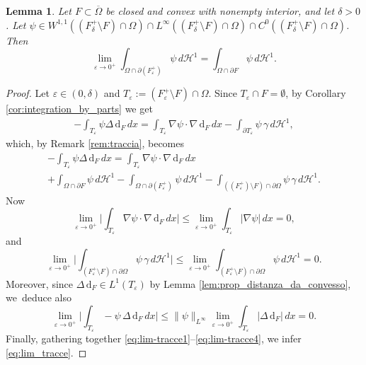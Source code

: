 \documentclass[11pt]{article}
\numberwithin{equation}{section}
\let\eps\varepsilon
\let\Om\Omega
\newcommand{\di}{\,\mathrm{d}}
\newtheorem{lemma}[theorem]{Lemma}
\theoremstyle{definition}
\begin{document}
\begin{lemma}\label{lem:limite_di_traccia}
Let $F\subset\overline\Om$ be closed and convex with nonempty interior,
and let $\delta>0$.
Let $\psi\in W^{1,1}((F^+_{\delta}\setminus F)\cap\Om)\cap L^\infty((F^+_{\delta}\setminus F)\cap\Om)\cap C^0((F^+_{\delta}\setminus F)\cap\Om)$. Then
\begin{equation}\label{eq:lim_tracce}
\lim_{\eps\to0^+} \int_{\Om\cap\partial(F^+_\eps)}\psi\,d\mathcal{H}^1=\int_{\Om\cap\partial F}\psi\,d\mathcal{H}^1.
\end{equation}
\end{lemma}

\begin{proof}
Let $\eps\in(0,\delta)$ and $T_\eps:=(F^+_\eps\setminus F)\cap \Omega$. Since $T_\eps\cap F=\emptyset$, by Corollary \ref{cor:integration_by_parts} we get
\begin{equation}\label{eq:lim_tracce*}
\begin{split}
-\int_{T_\eps}\psi\Delta\di_{F}\,dx
=
\int_{T_\eps} \nabla\psi\cdot\nabla\di_{F}\,dx- \int_{\partial T_\eps}\psi\,\gamma\,d\mathcal{H}^1,
\end{split}
\end{equation}
which, by Remark \ref{rem:traccia}, becomes
\begin{multline}\label{eq:lim-tracce1}
-\int_{T_\eps}\psi\Delta\di_{F}\,dx
= \int_{T_\eps} \nabla\psi\cdot\nabla\di_{F}\,dx\\
+ \int_{\Om\cap\partial F}\psi\,d\mathcal{H}^1
-\int_{\Om\cap\partial(F_\eps^+)}\psi\,d\mathcal{H}^1
-\int_{((F^+_\eps)\setminus F)\cap\partial \Om}\psi\,\gamma\,d\mathcal{H}^1.
\end{multline}
Now
\begin{equation}\label{eq:lim-tracce2}
\lim_{\eps\to0^+} \Big|\int_{T_\eps} \nabla\psi\cdot\nabla\di_{F}\,dx
\Big| \le\lim_{\eps\to0^+} \int_{T_\eps} |\nabla \psi|\,dx=0,
\end{equation}
and
\begin{equation}\label{eq:lim-tracce3}
\lim_{\eps\to0^+} \Big| \int_{(F^+_\eps\setminus F)\cap\partial\Om}\psi\,\gamma\,d\mathcal{H}^1\Big|\le
\lim_{\eps\to0^+} \int_{(F^+_\eps\setminus F)\cap\partial\Om}\psi\,d\mathcal{H}^1=0.
\end{equation}
Moreover, since $\Delta\di_{F}\in L^1(T_\eps)$ by Lemma \ref{lem:prop_distanza_da_convesso}, we~deduce also
\begin{equation}\label{eq:lim-tracce4}
\lim_{\eps\to0^+}\Big| \int_{T_\eps}-\psi\,\Delta\di_{F}\,dx\Big|\le \|\psi\|_{L^\infty}\lim_{\eps\to0^+} \int_{T_\eps}|\Delta \di_{F}|\,dx=0.
\end{equation}
Finally, gathering together \eqref{eq:lim-tracce1}--\eqref{eq:lim-tracce4}, we infer \eqref{eq:lim_tracce}.
\end{proof}
\end{document}
